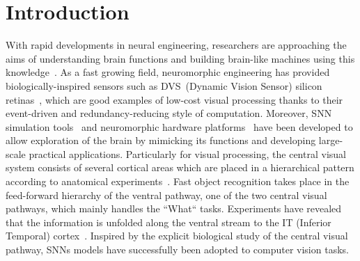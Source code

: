 \section{Introduction}
\label{sec:intro}
With rapid developments in neural engineering, researchers are approaching the aims of understanding brain functions and building brain-like machines using this knowledge~\citep{furber2007neural}.
As a fast growing field, neuromorphic engineering has provided biologically-inspired sensors such as DVS~(Dynamic Vision Sensor) silicon retinas~\citep{serrano-gotarredona_128_2013, lichtsteiner2008128}, which are good examples of low-cost visual processing thanks to their event-driven and redundancy-reducing style of computation.
Moreover, SNN simulation tools~\citep{davison2008pynn, gewaltig2007nest, goodman2008brian} and neuromorphic hardware platforms~\citep{furber2013overview,  schemmel2010wafer, moradi2014event} have been developed to allow exploration of the brain by mimicking its functions and developing large-scale practical applications.
Particularly for visual processing, the central visual system consists of several cortical areas which are placed in a hierarchical pattern according to anatomical experiments~\citep{felleman1991distributed}.
Fast object recognition takes place in  the feed-forward hierarchy of the ventral pathway, one of the two central visual pathways, which mainly handles the ``What`` tasks.
Experiments have revealed that the information is unfolded along the ventral stream to the  IT (Inferior Temporal) cortex~\citep{dicarlo2012does}.
Inspired by the  explicit  biological study of the central visual pathway, SNNs models have successfully been adopted to computer vision tasks. 

